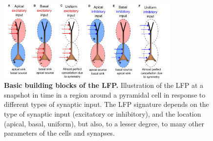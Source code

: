 \documentclass[preprint,11pt,authoryear]{elsarticle}
\begin{document}
\begin{figure}[ht!]
\begin{center}
\includegraphics[width=0.8\textwidth]{dipole_basics}
\end{center}
\caption{\textbf{Basic building blocks of the LFP.} Illustration of the LFP at a snapshot in time in a region around a pyramidal cell in response to different types of synaptic input.  
The LFP signature depends on the type of synaptic input (excitatory or inhibitory), and the location (apical, basal, uniform), but also, to a lesser degree, to many other parameters of the cells and synapses.
}
\label{fig:dipole_basics}
\end{figure}
\end{document}

